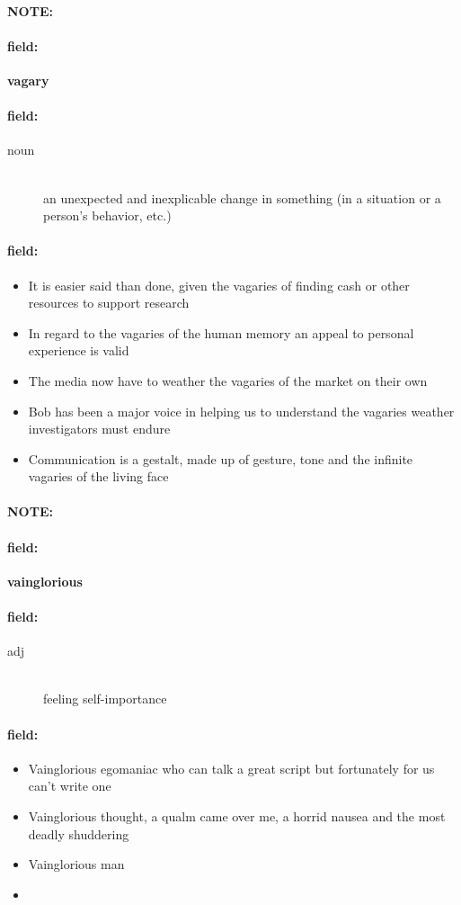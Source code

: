\documentclass[12pt]{article}
\newenvironment{note}{\paragraph{NOTE:}}{}
\newenvironment{field}{\paragraph{field:}}{}
\begin{document}
\begin{note}
\begin{field}
\textbf{\large vagary}
\end{field}


\begin{field}
\begin{description}
\item[noun] \hfill \\ 
an unexpected and inexplicable change in something (in a situation or a person's behavior, etc.)

\end{description}
\end{field}

\begin{field}
\begin{itemize}
\item It is easier said than done, given the vagaries of finding cash or other resources to support research
\item In regard to the vagaries of the human memory an appeal to personal experience is valid
\item The media now have to weather the vagaries of the market on their own
\item Bob has been a major voice in helping us to understand the vagaries weather investigators must endure
\item Communication is a gestalt, made up of gesture, tone and the infinite vagaries of the living face
\end{itemize}
\end{field}
\end{note}
\begin{note}
\begin{field}
\textbf{\large vainglorious}
\end{field}


\begin{field}
\begin{description}
\item[adj] \hfill \\ 
feeling self-importance

\end{description}
\end{field}

\begin{field}
\begin{itemize}
\item Vainglorious egomaniac who can talk a great script but fortunately for us can't write one
\item Vainglorious thought, a qualm came over me, a horrid nausea and the most deadly shuddering
\item Vainglorious man
\item 
\end{itemize}
\end{field}
\end{note}
\end{document}
